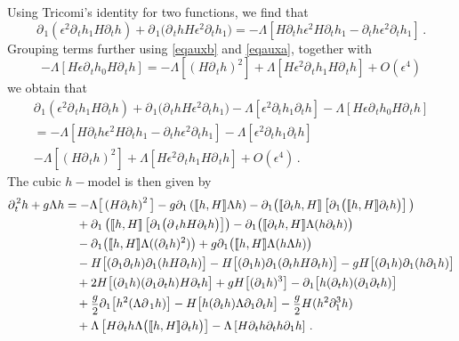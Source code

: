 \documentclass[11pt]{article}
\theoremstyle{plain}
\theoremstyle{definition}
\theoremstyle{definition}
\def\p{\text{\bf\emph{p}}}
\def\p{{\partial\hspace{1pt}}}
\def\comm#1#2{{\llbracket#1,#2\rrbracket}}
\def\smallexp#1{{\text{\small #1}}}
\def\dfrac#1#2{\smallexp{$\displaystyle{}\frac{#1}{#2}$}}
\begin{document}
Using Tricomi's identity for two functions, we find that
\begin{equation}\label{eqauxa}
\p_{\!1} (\epsilon^2\p_{\!t}h_1H\partial_t h)+\p_{\!1} \big(\p_{\!t} hH\epsilon^2\partial_t h_1\big)=-\Lambda\left[H\partial_t h\epsilon^2H\partial_t h_1-\partial_t h\epsilon^2\partial_t h_1\right] \,.
\end{equation}
Grouping terms further using \eqref{eqauxb} and \eqref{eqauxa}, together with
$$
-\Lambda\left[H\epsilon\p_{\!t} h_0H\p_{\!t} h\right]=-\Lambda\left[\left(H\p_{\!t} h\right)^2\right]+\Lambda\left[H\epsilon^2\p_{\!t} h_1H\p_{\!t} h\right]+O(\epsilon^4)
$$
we obtain that
\begin{multline*}
\p_{\!1} (\epsilon^2\p_{\!t}h_1H\partial_t h)+\p_{\!1} \big(\p_{\!t} hH\epsilon^2\partial_t h_1\big)-\Lambda \left[\epsilon^2\partial_t h_1\partial_t h\right]-\Lambda\left[H\epsilon\p_{\!t} h_0H\p_{\!t} h\right]\\
=-\Lambda\left[H\partial_t h\epsilon^2H\partial_t h_1-\partial_t h\epsilon^2\partial_t h_1\right]-\Lambda \left[\epsilon^2\partial_t h_1\partial_t h\right]\\
-\Lambda\left[\left(H\p_{\!t} h\right)^2\right]+\Lambda\left[H\epsilon^2\p_{\!t} h_1H\p_{\!t} h\right]+O(\epsilon^4)\,.
\end{multline*}
The cubic $h-$model is then given by
\begin{align*}
\p_{\!t}^2 h + g\Lambda h &=-\Lambda \big[\left(H\p_{\!t} h\right)^2\big] -g\p_{\!1} \left(\comm{h}{H} \Lambda h\right) - \p_{\!1} \big(\comm{\p_{\!t} h}{H} \left[\p_{\!1} \big(\comm{h}{H} \partial_t h\big)\right]\big) \\
&\quad +\p_{\!1} \left(\comm{h}{H} \left[\partial_1 \big(\p_t hH\partial_t h \big)\right]\right) - \p_{\!1} \big(\comm{\p_{\!t} h}{H} \Lambda (h \partial_t h)\big) \\
&\quad - \p_{\!1} \big(\comm{h}{H} \Lambda ((\p_{\!t} h)^2)\big) + g\p_{\!1} \big(\comm{h}{H} \Lambda (h \Lambda h)\big) \\
&\quad - H \big[(\p_{\!1} \p_{\!t} h) \p_{\!1}(h H\p_{\!t} h)\big] - H \big[(\p_{\!1} h) \p_{\!1}(\p_{\!t} h H\p_{\!t} h)\big]
 - gH \big[(\p_{\!1} h) \p_{\!1}(h \partial_1 h)\big] \nonumber\\
&\quad + 2 H \big[(\p_{\!1}h) (\p_{\!1} \p_{\!t} h) H\p_{\!t} h\big] + gH \big[(\p_{\!1}h)^3\big] - \p_{\!1} \big[h (\p_{\!t} h) (\partial_1 \p_{\!t} h) \big] \\
&\quad + \dfrac{g}{2} \p_{\!1} \big[h^2 (\Lambda \p_{1} h)\big] - H \big[h (\p_{\!t} h)\Lambda \partial_1\p_{\!t} h\big] - \dfrac{g}{2} H (h^2 \partial_1^3h)\\
&\quad +\Lambda \left[H\p_{\!t} h\Lambda \big(\comm{h}{H}  \p_{\!t} h\big)\right]- \Lambda \left[ H\p_{\!t} h \partial_t h \p_{\!1} h \right]\,.
\end{align*}
\end{document}
